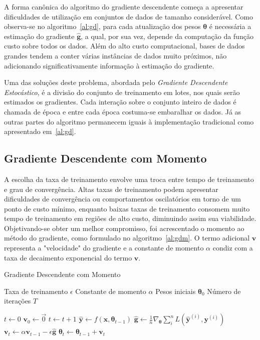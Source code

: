 A forma canônica do algoritmo do gradiente descendente começa a apresentar dificuldades de utilização em conjuntos de dados de tamanho considerável. Como observa-se no algoritmo~\ref{al:gd}, para cada atualização dos pesos $\boldsymbol{\theta}$ é necessária a estimação do gradiente $\mathbf{\hat{g}}$, a qual, por sua vez, depende da computação da função custo sobre todos os dados. Além do alto custo computacional, bases de dados grandes tendem a conter várias instâncias de dados muito próximos, não adicionando significativamente informação à estimação do gradiente.

Uma das soluções deste problema, abordada pelo \textit{Gradiente Descendente Estocástico}, é a divisão do conjunto de treinamento em lotes, nos quais serão estimados os gradientes. Cada interação sobre o conjunto inteiro de dados é chamada de época e entre cada época costuma-se embaralhar os dados. Já as outras partes do algoritmo permanecem iguais à implementação tradicional como apresentado em~\ref{al:gd}.

\subsection{Gradiente Descendente com Momento}

A escolha da taxa de treinamento envolve uma troca entre tempo de treinamento e grau de convergência. Altas taxas de treinamento podem apresentar dificuldades de convergência ou comportamentos oscilatórios em torno de um ponto de custo mínimo, enquanto baixas taxas de treinamento consomem muito tempo de treinamento em regiões de alto custo, diminuindo assim sua viabilidade. Objetivando-se obter um melhor compromisso, foi acrescentado o momento ao método do gradiente, como formulado no algoritmo~\ref{al:gdm}. O termo adicional $\mathbf{v}$ representa a "velocidade" do gradiente e a constante de momento $\alpha$ condiz com a taxa de decaimento exponencial do termo $\mathbf{v}$.

\begin{algorithm}
    \caption{Gradiente Descendente com Momento}
    \label{al:gdm}
    \begin{algorithmic}
        \Require Taxa de treinamento $\epsilon$
        \Require Constante de momento $\alpha$
        \Require Pesos iniciais $\boldsymbol{\theta}_{0}$
        \Require Número de iterações $T$

        \State $t \gets 0$
        \State $\mathbf{v}_{0} \gets \vec{0}$
            \State $t \gets t + 1$
            \State $\mathbf{\hat{y}} \gets f(\mathbf{x}, \boldsymbol{\theta}_{t-1})$
            \State $\mathbf{\hat{g}} \gets \frac{1}{n} \nabla_{\boldsymbol{\theta}} \sum_i^n L(\mathbf{\hat{y}}^{(i)}, \mathbf{y}^{(i)})$
            \State $\mathbf{v}_{t} \gets \alpha \mathbf{v}_{t-1} - \epsilon \mathbf{\hat{g}}$
            \State $\boldsymbol{\theta}_{t} \gets \boldsymbol{\theta}_{t-1} + \mathbf{v}_t$
        \EndWhile
    \end{algorithmic}
\end{algorithm}

